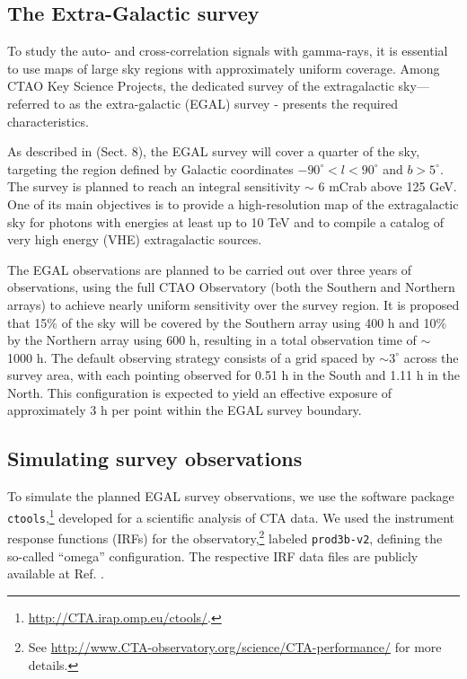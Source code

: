 \subsection{The Extra-Galactic survey}

To study the auto- and cross-correlation signals with gamma-rays, {it is essential to use maps of large sky regions with approximately uniform coverage}. Among CTAO Key Science Projects, the dedicated survey of the extragalactic sky---referred to as the extra-galactic (EGAL) survey - presents the required characteristics.

As described in \cite{CTAConsortium:2018tzg} (Sect. 8), the EGAL survey will cover a quarter of the sky, targeting the region defined by Galactic coordinates $-90^\circ < l < 90^\circ$ and $b > 5^\circ$. The survey is planned to reach an integral sensitivity $\sim$ 6 mCrab above 125 GeV. One of its main objectives is to provide a high-resolution map of the extragalactic sky for photons with energies at least up to 10 TeV and to compile a catalog of very high energy (VHE) extragalactic sources.

The EGAL observations are planned to be carried out over three years of observations, using the full CTAO Observatory (both the Southern and Northern arrays) to achieve nearly uniform sensitivity over the survey region. It is proposed that 15\% of the sky will be covered by the Southern array using 400 h and 10\% by the Northern array using 600 h, resulting in a total observation time of $\sim$ 1000 h. The default {observing strategy consists of a grid spaced by $\sim 3^\circ$ across the survey area, with each pointing observed for 0.51 h in the South and 1.11 h in the North. This configuration is expected to yield an effective exposure of approximately 3 h per point within the EGAL survey boundary.} 

\subsection{Simulating survey observations}
To simulate the planned EGAL survey observations, we use the software package \texttt{ctools},\footnote{\url{http://CTA.irap.omp.eu/ctools/}.} developed for a scientific analysis of CTA data. 
We used the instrument response functions (IRFs) for the observatory,\footnote{See \url{http://www.CTA-observatory.org/science/CTA-performance/} for more details.} labeled \texttt{prod3b-v2}, defining the so-called ``omega'' configuration. The respective IRF data files are publicly available at Ref. \cite{zenodo}.

